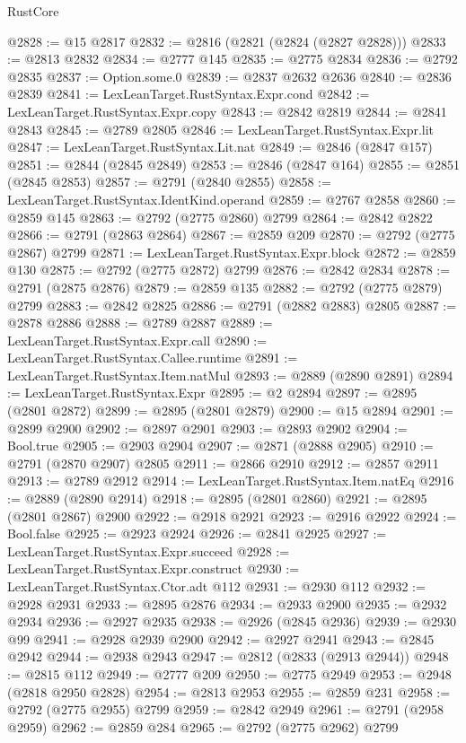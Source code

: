 \begin{lexlean}{RustCore}
\begin{coremodule}
@2828 := @15 @2817
@2832 := @2816 (@2821 (@2824 (@2827 @2828)))
@2833 := @2813 @2832
@2834 := @2777 @145
@2835 := @2775 @2834
@2836 := @2792 @2835
@2837 := Option.some.{0}
@2839 := @2837 @2632 @2636
@2840 := @2836 @2839
@2841 := LexLeanTarget.RustSyntax.Expr.cond
@2842 := LexLeanTarget.RustSyntax.Expr.copy
@2843 := @2842 @2819
@2844 := @2841 @2843
@2845 := @2789 @2805
@2846 := LexLeanTarget.RustSyntax.Expr.lit
@2847 := LexLeanTarget.RustSyntax.Lit.nat
@2849 := @2846 (@2847 @157)
@2851 := @2844 (@2845 @2849)
@2853 := @2846 (@2847 @164)
@2855 := @2851 (@2845 @2853)
@2857 := @2791 (@2840 @2855)
@2858 := LexLeanTarget.RustSyntax.IdentKind.operand
@2859 := @2767 @2858
@2860 := @2859 @145
@2863 := @2792 (@2775 @2860) @2799
@2864 := @2842 @2822
@2866 := @2791 (@2863 @2864)
@2867 := @2859 @209
@2870 := @2792 (@2775 @2867) @2799
@2871 := LexLeanTarget.RustSyntax.Expr.block
@2872 := @2859 @130
@2875 := @2792 (@2775 @2872) @2799
@2876 := @2842 @2834
@2878 := @2791 (@2875 @2876)
@2879 := @2859 @135
@2882 := @2792 (@2775 @2879) @2799
@2883 := @2842 @2825
@2886 := @2791 (@2882 @2883) @2805
@2887 := @2878 @2886
@2888 := @2789 @2887
@2889 := LexLeanTarget.RustSyntax.Expr.call
@2890 := LexLeanTarget.RustSyntax.Callee.runtime
@2891 := LexLeanTarget.RustSyntax.Item.natMul
@2893 := @2889 (@2890 @2891)
@2894 := LexLeanTarget.RustSyntax.Expr
@2895 := @2 @2894
@2897 := @2895 (@2801 @2872)
@2899 := @2895 (@2801 @2879)
@2900 := @15 @2894
@2901 := @2899 @2900
@2902 := @2897 @2901
@2903 := @2893 @2902
@2904 := Bool.true
@2905 := @2903 @2904
@2907 := @2871 (@2888 @2905)
@2910 := @2791 (@2870 @2907) @2805
@2911 := @2866 @2910
@2912 := @2857 @2911
@2913 := @2789 @2912
@2914 := LexLeanTarget.RustSyntax.Item.natEq
@2916 := @2889 (@2890 @2914)
@2918 := @2895 (@2801 @2860)
@2921 := @2895 (@2801 @2867) @2900
@2922 := @2918 @2921
@2923 := @2916 @2922
@2924 := Bool.false
@2925 := @2923 @2924
@2926 := @2841 @2925
@2927 := LexLeanTarget.RustSyntax.Expr.succeed
@2928 := LexLeanTarget.RustSyntax.Expr.construct
@2930 := LexLeanTarget.RustSyntax.Ctor.adt @112
@2931 := @2930 @112
@2932 := @2928 @2931
@2933 := @2895 @2876
@2934 := @2933 @2900
@2935 := @2932 @2934
@2936 := @2927 @2935
@2938 := @2926 (@2845 @2936)
@2939 := @2930 @99
@2941 := @2928 @2939 @2900
@2942 := @2927 @2941
@2943 := @2845 @2942
@2944 := @2938 @2943
@2947 := @2812 (@2833 (@2913 @2944))
@2948 := @2815 @112
@2949 := @2777 @209
@2950 := @2775 @2949
@2953 := @2948 (@2818 @2950 @2828)
@2954 := @2813 @2953
@2955 := @2859 @231
@2958 := @2792 (@2775 @2955) @2799
@2959 := @2842 @2949
@2961 := @2791 (@2958 @2959)
@2962 := @2859 @284
@2965 := @2792 (@2775 @2962) @2799

\end{coremodule}
\end{lexlean}
